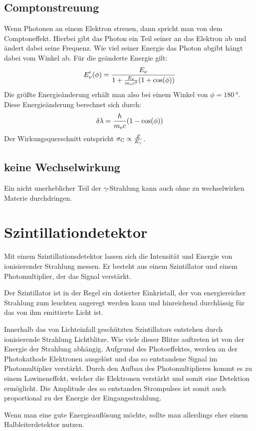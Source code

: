 \documentclass[11pt, ngerman, fleqn, DIV=15, headinclude, BCOR=2cm]{scrreprt}
\begin{document}
\subsection{Comptonstreuung}
Wenn Photonen an einem Elektron streuen, dann spricht man von dem
Comptoneffekt. 
Hierbei gibt das Photon ein Teil seiner an das Elektron ab und ändert dabei
seine Frequenz.
Wie viel seiner Energie das Photon abgibt hängt dabei vom Winkel ab.
Für die geänderte Energie gilt:
\[
    E_\nu'(\phi) = \frac{E_\nu}{1+\frac{E_\nu}{m_\text ec^2}(1+\cos(\phi))}
\]
Die größte Energieänderung erhält man also bei einem Winkel von
$\phi=\SI{180}{\degree}$.
Diese Energieänderung berechnet sich durch:
\[
    \delta\lambda = \frac{h}{m_\text ec}(1-\cos(\phi))
\]
Der Wirkungsquerschnitt entspricht $\sigma_\text C \propto \frac{Z}{E_\gamma}$.

\subsection{keine Wechselwirkung}
Ein nicht unerheblicher Teil der $\gamma$-Strahlung kann auch ohne zu
wechselwirken Materie durchdringen.

\section{Szintillationdetektor}
Mit einem Szintillationsdetektor lassen sich die Intensität und Energie von
ionisierender Strahlung messen.
Er besteht aus einem Szintillator und einem Photomultiplier, der das Signal
verstärkt.

Der Szintillator ist in der Regel ein dotierter Einkristall, der von
energiereicher Strahlung zum leuchten angeregt werden kann und hinreichend
durchlässig für das von ihm emittierte Licht ist.

Innerhalb das von Lichteinfall geschützten Szintillators entstehen durch
ionisierende Strahlung Lichtblitze. 
Wie viele dieser Blitze auftreten ist von der Energie der Strahlung abhängig.
Aufgrund des Photoeffektes, werden an der Photokathode Elektronen ausgelöst und
das so entstandene Signal im Photomultiplier verstärkt.
Durch den Aufbau des Photomultiplieres kommt es zu einem Lawineneffekt, welcher
die Elektronen verstärkt und somit eine Detektion ermöglicht.
Die Amplitude des so entstanden Strompulses ist somit auch proportional zu der
Energie der Eingangsstrahlung.

Wenn man eine gute Energieauflösung möchte, sollte man allerdings eher einem
Halbleiterdetektor nutzen.
\end{document}
